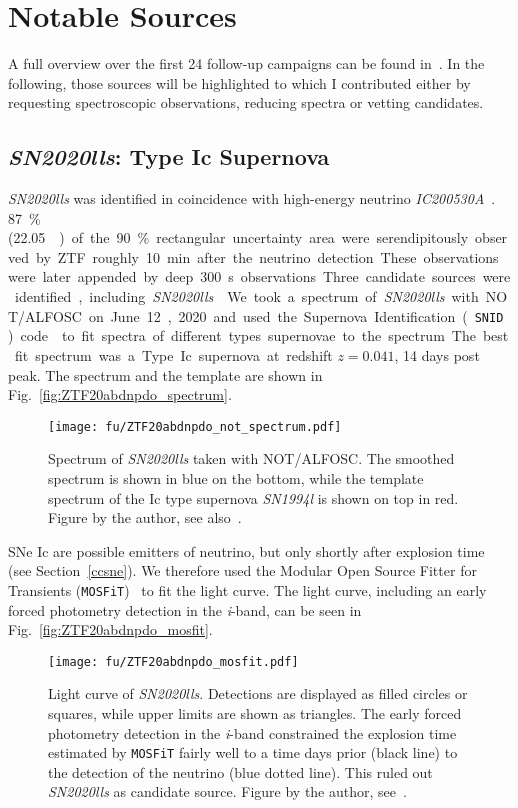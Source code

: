 \section{Notable Sources}
A full overview over the first 24 follow-up campaigns can be found in~. In the following, those sources will be highlighted to which I contributed either by requesting spectroscopic observations, reducing spectra or vetting candidates.

\subsection{\emph{SN2020lls}: Type Ic Supernova}\label{SN2020lls}
\textit{SN2020lls} was identified in coincidence with high-energy neutrino \emph{IC200530A}~. \SI{87}{\percent} (\SI{22.05}{\square\deg}) of the \SI{90}{\percent} rectangular uncertainty area were serendipitously observed by ZTF roughly \SI{10}{\minute} after the neutrino detection. These observations were later appended by deep \SI{300}{\second} observations Three candidate sources were identified, including \emph{SN2020lls}~.

We took a spectrum of \emph{SN2020lls} with NOT/ALFOSC on June 12, 2020 and used the Supernova Identification (\texttt{SNID}) code~ to fit spectra of different types supernovae to the spectrum. The best fit spectrum was a Type Ic supernova at redshift $z=0.041$, 14 days post peak. The spectrum and the template are shown in Fig.~\ref{fig:ZTF20abdnpdo_spectrum}.

\begin{figure}[h!]
    \texttt{[image: fu/ZTF20abdnpdo\_not\_spectrum.pdf]}
    \caption[\textit{SN2020lls} spectrum]{Spectrum of \textit{SN2020lls} taken with NOT/ALFOSC. The smoothed spectrum is shown in blue on the bottom, while the template spectrum of the Ic type supernova \emph{SN1994l} is shown on top in red. Figure by the author, see also~\cite{Stein2023a}.}
\end{figure}
SNe Ic are possible emitters of neutrino, but only shortly after explosion time (see Section~\ref{ccsne}). We therefore used the Modular Open Source Fitter for Transients (\texttt{MOSFiT})~ to fit the light curve. The light curve, including an early forced photometry detection in the \textit{i}-band, can be seen in Fig.~\ref{fig:ZTF20abdnpdo_mosfit}.

\begin{figure}[htb]
    \texttt{[image: fu/ZTF20abdnpdo\_mosfit.pdf]}
    \caption[\emph{SN2020lls} light curve fit]{Light curve of \emph{SN2020lls}. Detections are displayed as filled circles or squares, while upper limits are shown as triangles. The early forced photometry detection in the \textit{i}-band constrained the explosion time estimated by \texttt{MOSFiT} fairly well to a time days prior (black line) to the detection of the neutrino (blue dotted line). This ruled out \emph{SN2020lls} as candidate source. Figure by the author, see~\cite{Stein2023a}.}
\end{figure}

